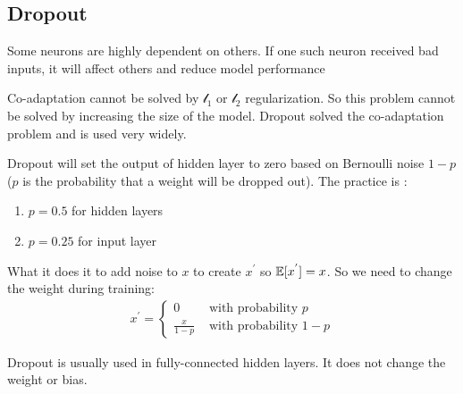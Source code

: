 \subsection{Dropout}

\begin{definition}[Co-adaptation]
    Some neurons are highly dependent on others. If one such neuron received bad inputs, it will affect others and reduce model performance    
\end{definition}

Co-adaptation cannot be solved by $\mathcal{l}_1$ or $\mathcal{l}_2$ regularization. So this problem cannot be solved by increasing the size of the model. Dropout solved the co-adaptation problem and is used very widely.

Dropout will set the output of hidden layer to zero based on Bernoulli noise $1-p$ ($p$ is the probability that a weight will be dropped out). The practice is :
\begin{enumerate}
    \item $p=0.5$ for hidden layers
    \item $p= 0.25$ for input layer
\end{enumerate}

What it does it to add noise to $x$ to create $x^{'}$ so $\mathbb{E}[{x^{'}}]= x$. So we need to change the weight during training:
\begin{equation}
    \begin{aligned}
        x^{'} = \begin{cases}
            0 & \text{ with probability }  p \\
            \displaystyle \frac{x}{1-p} & \text{ with probability }  1-p
        \end{cases}
    \end{aligned}
\end{equation}

Dropout is usually used in fully-connected hidden layers. It does not change the weight or bias. 

